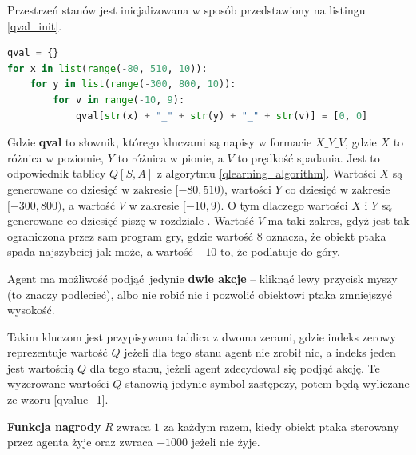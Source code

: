 \documentclass[a4paper, 12pt,twoside]{report}
\begin{document}
Przestrzeń stanów jest inicjalizowana w sposób przedstawiony na listingu
\ref{qval_init}.
\begin{lstlisting}[language=Python, label={qval_init}, caption={Inicjalizacja
Q-Values.}, captionpos=t]
qval = {}
for x in list(range(-80, 510, 10)):
    for y in list(range(-300, 800, 10)):
        for v in range(-10, 9):
            qval[str(x) + "_" + str(y) + "_" + str(v)] = [0, 0]
\end{lstlisting}
Gdzie \textbf{qval} to słownik, którego kluczami są napisy w formacie
$X\_Y\_V$, gdzie $X$ to różnica w poziomie, $Y$ to różnica w pionie, a $V$ to
prędkość spadania. Jest to odpowiednik tablicy $Q[S,A]$ z algorytmu
\ref{qlearning_algorithm}. Wartości $X$ są generowane co dziesięć w zakresie
$[-80,510)$, wartości $Y$ co dziesięć w zakresie $[-300,800)$, a wartość $V$ w
zakresie $[-10,9)$. O tym dlaczego wartości $X$ i $Y$ są generowane co dziesięć
piszę w rozdziale . Wartość $V$ ma taki zakres, gdyż
jest tak ograniczona przez sam program gry, gdzie wartość $8$ oznacza, że
obiekt ptaka spada najszybciej jak może, a wartość $-10$ to, że podlatuje do
góry.

Agent ma możliwość podjąć jedynie \textbf{dwie akcje} -- kliknąć lewy przycisk
myszy (to znaczy podlecieć), albo nie robić nic i pozwolić obiektowi ptaka
zmniejszyć wysokość.

Takim kluczom jest przypisywana tablica z dwoma zerami, gdzie
indeks zerowy reprezentuje wartość $Q$ jeżeli dla tego stanu agent nie zrobił
nic, a indeks jeden jest wartością $Q$ dla tego stanu, jeżeli agent zdecydował
się podjąć akcję. Te wyzerowane wartości $Q$ stanowią jedynie symbol zastępczy,
potem będą wyliczane ze wzoru \ref{qvalue_1}.

\textbf{Funkcja nagrody} $R$ zwraca $1$ za każdym razem, kiedy obiekt
ptaka sterowany przez agenta żyje oraz zwraca $-1000$ jeżeli nie żyje.
\end{document}
